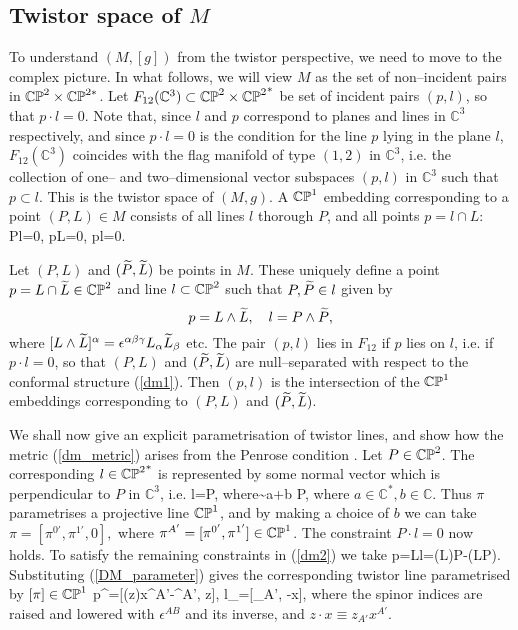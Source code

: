 \subsection{Twistor space of $M$}
\label{twist_SSS}
To understand $(M,[g])$ from the twistor perspective, we need to move to the complex picture. In what follows, we will view $M$ as the set of non--incident pairs in $\mathbb{CP}^2\times\mathbb{CP}^{2*}$. Let $F_{12}(\mathbb{C}^3)\subset \mathbb{CP}^2\times {\mathbb{CP}^2}^*$ be set of incident pairs 
$(p, l)$, so that $p\cdot l=0$. Note that, since $l$ and $p$ correspond to planes and lines in $\mathbb{C}^3$ respectively, and since $p\cdot l=0$ is the condition for the line $p$ lying in the plane $l$, $F_{12}(\mathbb{C}^3)$ coincides with the flag manifold of type $(1,2)$ in $\mathbb{C}^3$, i.e. the collection of one-- and two--dimensional vector subspaces $(p,l)$ in $\mathbb{C}^3$ such that $p\subset l$. This is the twistor space of $(M, g)$.
A $\mathbb{CP}^1$ embedding corresponding to a point $(P, L)\in M$
consists of all lines $l$ thorough $P$, and all points
$p=l\cap L$:
\be
\label{dm2}
P\cdot l=0, \quad p\cdot L=0, \quad p\cdot l=0.
\ee

Let $(P, L)$ and $(\widetilde{P}, \widetilde{L})$ be points in $M$. These uniquely define a point $p=L\cap\widetilde{L}\in\mathbb{CP}^2$ and line $l\subset\mathbb{CP}^2$ such that $P,\widetilde{P}\in l$ given by
\[
p=L\wedge \widetilde{L}, \quad l=P\wedge \widetilde{P},
\]
where $[L\wedge\widetilde{L}]^{\alpha}=\epsilon^{\alpha\beta\gamma}L_{\alpha}\widetilde{L}_{\beta}$ etc.
The pair $(p,l)$ lies in $F_{12}$ if $p$ lies on $l$, i.e. if $p\cdot l=0$, so that $(P, L)$ and $(\widetilde{P}, \widetilde{L})$ are null--separated with respect to the conformal structure
(\ref{dm1}). Then $(p,l)$ is the intersection of the $\mathbb{CP}^1$ embeddings corresponding to $(P, L)$ and $(\widetilde{P}, \widetilde{L})$. %

We shall now give an explicit parametrisation of twistor lines, and show how 
the metric (\ref{dm_metric}) arises from the Penrose condition 
\cite{penrose,ward}.
Let $P\in \mathbb{CP}^2$. The corresponding $l\in {\mathbb{CP}^2}^*$ is represented by some normal vector which is perpendicular to $P$ in $\mathbb{C}^3$, i.e.
\be \label{eq:l=Pwedgepi}
l=P\wedge \pi, \quad \mbox{where}\quad  \pi\sim a\pi+b P,
\ee
where $a\in \mathbb{C}^*, b\in \mathbb{C}$. Thus $\pi$ parametrises a projective line $\mathbb{CP}^1$,
and by making a choice of $b$ we can take
$
\pi=[\pi^{0'}, \pi^{1'}, 0], 
$ where $\pi^{A'}=[\pi^{0'}, \pi^{1'}]\in \mathbb{CP}^1$. The constraint $P\cdot l=0$ now holds.
To satisfy the remaining constraints in (\ref{dm2}) we take
\be \label{eq:p=Lwedgel}
p=L\wedge l=(L\cdot\pi)P-(L\cdot P)\pi.
\ee
Substituting (\ref{DM_parameter}) gives 
the corresponding twistor line parametrised by $[\pi]\in\mathbb{CP}^1$ 
\be
\label{sl3curves}
p^{\alpha}=[(z\cdot \pi)x^{A'}-\pi^{A'}, z\cdot \pi], \quad l_\alpha=[\pi_{A'}, -\pi\cdot x],
\ee
where the spinor indices are raised and lowered with $\epsilon^{AB}$ and its inverse, and  $z\cdot x\equiv z_{A'}x^{A'}$. 

